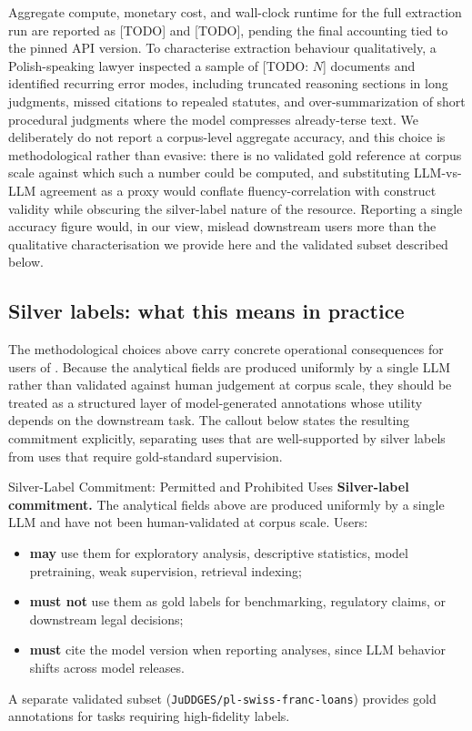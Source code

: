 Aggregate compute, monetary cost, and wall-clock runtime for the full extraction run are reported as [TODO] and [TODO], pending the final accounting tied to the pinned API version. To characterise extraction behaviour qualitatively, a Polish-speaking lawyer inspected a sample of [TODO: $N$] documents and identified recurring error modes, including truncated reasoning sections in long judgments, missed citations to repealed statutes, and over-summarization of short procedural judgments where the model compresses already-terse text. We deliberately do not report a corpus-level aggregate accuracy, and this choice is methodological rather than evasive: there is no validated gold reference at corpus scale against which such a number could be computed, and substituting LLM-vs-LLM agreement as a proxy would conflate fluency-correlation with construct validity while obscuring the silver-label nature of the resource. Reporting a single accuracy figure would, in our view, mislead downstream users more than the qualitative characterisation we provide here and the validated subset described below.

\subsection{Silver labels: what this means in practice}
\label{sec:pipeline:silver}

The methodological choices above carry concrete operational consequences for users of \juddgespl{}. Because the analytical fields are produced uniformly by a single LLM rather than validated against human judgement at corpus scale, they should be treated as a structured layer of model-generated annotations whose utility depends on the downstream task. The callout below states the resulting commitment explicitly, separating uses that are well-supported by silver labels from uses that require gold-standard supervision.

\begin{silverbox}{Silver-Label Commitment: Permitted and Prohibited Uses}
\textbf{Silver-label commitment.} The analytical fields above are produced uniformly by a single LLM and have not been human-validated at corpus scale. Users:
\begin{itemize}
  \item \textbf{may} use them for exploratory analysis, descriptive statistics, model pretraining, weak supervision, retrieval indexing;
  \item \textbf{must not} use them as gold labels for benchmarking, regulatory claims, or downstream legal decisions;
  \item \textbf{must} cite the model version when reporting analyses, since LLM behavior shifts across model releases.
\end{itemize}
A separate validated subset (\texttt{JuDDGES/pl-swiss-franc-loans}) provides gold annotations for tasks requiring high-fidelity labels.
\end{silverbox}

